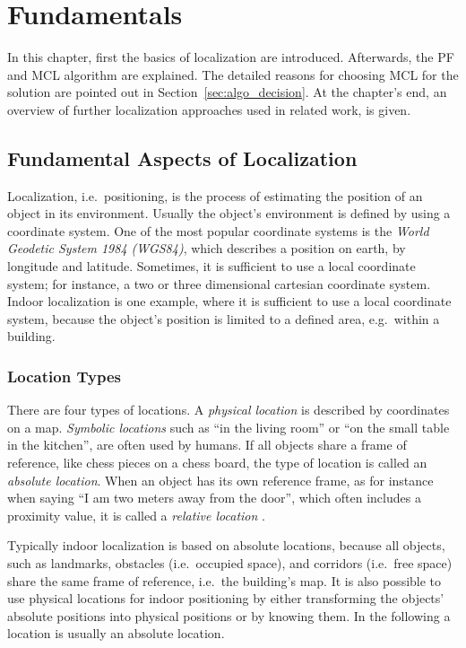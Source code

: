 \chapter{Fundamentals}\label{chap:fundamentals}

In this chapter, first the basics of localization are introduced. Afterwards, the \acf{PF} and \acf{MCL} algorithm are explained. The detailed reasons for choosing \ac{MCL} for the solution are pointed out in Section~\ref{sec:algo_decision}. At the chapter's end, an overview of further localization approaches used in related work, is given.

\section{Fundamental Aspects of Localization}\label{sec:fund_loc}

Localization, i.e.\ positioning, is the process of estimating the position of an object in its environment. Usually the object's environment is defined by using a coordinate system. One of the most popular coordinate systems is the \emph{World Geodetic System 1984 (WGS84)}, which describes a position on earth, by longitude and latitude. Sometimes, it is sufficient to use a local coordinate system; for instance, a two or three dimensional cartesian coordinate system. Indoor localization is one example, where it is sufficient to use a local coordinate system, because the object's position is limited to a defined area, e.g.\ within a building.

\subsection{Location Types}
There are four types of locations. A \emph{physical location} is described by coordinates on a map. \emph{Symbolic locations} such as ``in the living room'' or ``on the small table in the kitchen'', are often used by humans. If all objects share a frame of reference, like chess pieces on a chess board, the type of location is called an \emph{absolute location}. When an object has its own reference frame, as for instance when saying ``I am two meters away from the door'', which often includes a proximity value, it is called a \emph{relative location} \citep{IEEE:survey_wireless_indoor_pos}.

Typically indoor localization is based on absolute locations, because all objects, such as landmarks, obstacles (i.e.\ occupied space), and corridors (i.e.\ free space) share the same frame of reference, i.e.\ the building's map. It is also possible to use physical locations for indoor positioning by either transforming the objects' absolute positions into physical positions or by knowing them. In the following a location is usually an absolute location.

